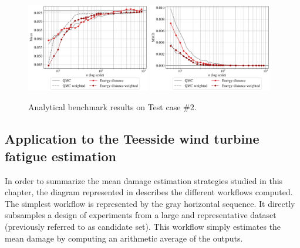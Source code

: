 \begin{figure}[!h]
\begin{center}
    \includegraphics[width=0.48\textwidth]{part2/figures/DCE/analytical_bench/GSobol_10D_(normal_input)_convergence_ED.pdf}
    \includegraphics[width=0.48\textwidth]{part2/figures/DCE/analytical_bench/GSobol_10D_(normal_input)_convergence_MMD_ED.pdf}\\
\end{center}
\caption{Analytical benchmark results on Test case \#2.} \label{fig:test case2}
\end{figure}

\subsection{Application to the Teesside wind turbine fatigue estimation}
In order to summarize the mean damage estimation strategies studied in this chapter, the diagram represented in  describes the different workflows computed. 
The simplest workflow is represented by the gray horizontal sequence. 
It directly subsamples a design of experiments from a large and representative dataset (previously referred to as candidate set). 
This workflow simply estimates the mean damage by computing an arithmetic average of the outputs. 

